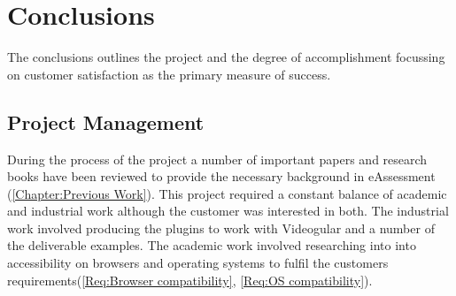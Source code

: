 \chapter{Conclusions} \label{Chapter: Conclusions}

\begin{preamble}
	The conclusions outlines the project and the degree of accomplishment focussing on customer satisfaction as the primary measure of success.
\end{preamble}


%
%
%
%
%
%

\section{Project Management}

During the process of the project a number of important papers and research books have been reviewed to provide the necessary background in eAssessment (\autoref{Chapter:Previous Work}). This project required a constant balance of academic and industrial work although the customer was interested in both. The industrial work involved producing the plugins to work with \gls{Videogular} and a number of the deliverable examples. The academic work involved researching into into accessibility on browsers and operating systems to fulfil the customers requirements(\cref{Req:Browser compatibility}, \cref{Req:OS compatibility}).

